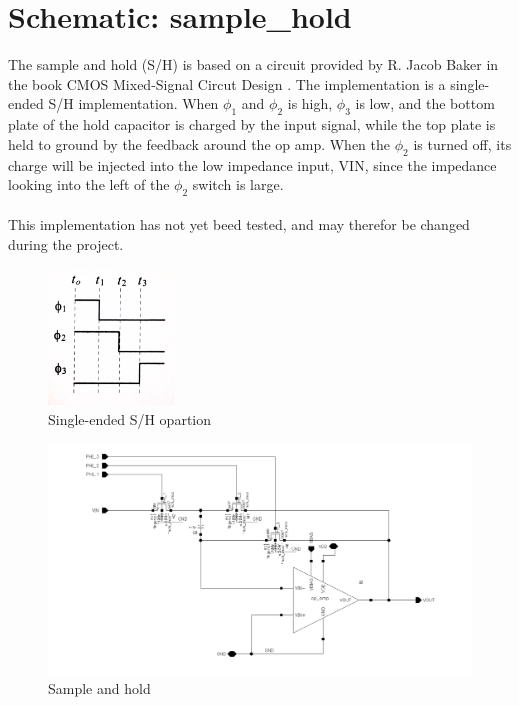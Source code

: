 \documentclass[english, a4paper,11pt]{article}
\begin{document}
\section*{Schematic: sample\_hold}
The sample and hold (S/H) is based on a circuit provided by R. Jacob Baker in the book CMOS Mixed-Signal Circut Design \cite{CMOS-baker}. The implementation is a single-ended S/H implementation. 
When $\phi_{1}$ and $\phi_{2}$ is high, $\phi_{3}$ is low, and the bottom plate of the hold capacitor is charged by the input signal, while the top plate is held to ground by the feedback around the 
op amp. When the $\phi_{2}$ is turned off, its charge will be injected into the low impedance input, VIN, since the impedance looking into the left of the $\phi_{2}$ switch is large.\\
\\
This implementation has not yet beed tested, and may therefor be changed during the project.\\
\begin{figure}[!ht]
 \centering
   \includegraphics[width=0.3\textwidth]{img/timing_sample_hold.jpg}
   \caption{Single-ended S/H opartion \cite{CMOS-baker}}
   \label{timing}
\end{figure}
\begin{figure}[!ht]
 \centering
   \includegraphics[width=\textwidth]{img/sample_hold}
   \caption{Sample and hold}
   \label{sample:hold}
\end{figure}
\end{document}
